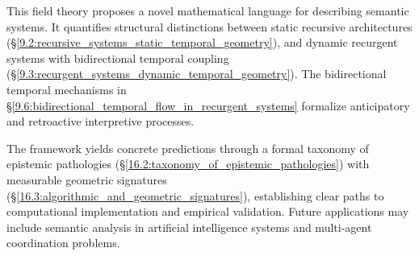 This field theory proposes a novel mathematical language for describing semantic systems. It quantifies structural distinctions between static recursive architectures (\S\ref{9.2:recursive_systems_static_temporal_geometry}), and dynamic recurgent systems with bidirectional temporal coupling (\S\ref{9.3:recurgent_systems_dynamic_temporal_geometry}). The bidirectional temporal mechanisms in \S\ref{9.6:bidirectional_temporal_flow_in_recurgent_systems} formalize anticipatory and retroactive interpretive processes.

The framework yields concrete predictions through a formal taxonomy of epistemic pathologies (\S\ref{16.2:taxonomy_of_epistemic_pathologies}) with measurable geometric signatures (\S\ref{16.3:algorithmic_and_geometric_signatures}), establishing clear paths to computational implementation and empirical validation. Future applications may include semantic analysis in artificial intelligence systems and multi-agent coordination problems.